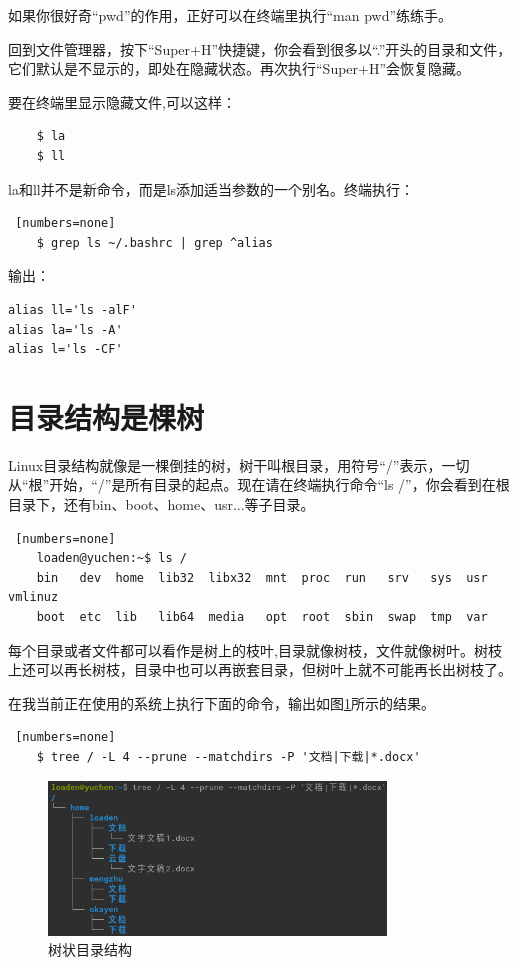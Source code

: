 \par 如果你很好奇“pwd”的作用，正好可以在终端里执行“man pwd”练练手。
\par 回到文件管理器，按下“Super+H”快捷键，你会看到很多以“.”开头的目录和文件，它们默认是不显示的，即处在隐藏状态。再次执行“Super+H”会恢复隐藏。

\par 要在终端里显示隐藏文件,可以这样：
\begin{lstlisting}
    $ la
    $ ll
\end{lstlisting}

\par la和ll并不是新命令，而是ls添加适当参数的一个别名。终端执行：
\begin{lstlisting} [numbers=none]
    $ grep ls ~/.bashrc | grep ^alias
\end{lstlisting}
\par 输出：
\begin{lstlisting}
alias ll='ls -alF'
alias la='ls -A'
alias l='ls -CF'
\end{lstlisting}


\section{目录结构是棵树}

\par Linux目录结构就像是一棵倒挂的树，树干叫根目录，用符号“/”表示，一切从“根”开始，“/”是所有目录的起点。现在请在终端执行命令“ls /”，你会看到在根目录下，还有bin、boot、home、usr...等子目录。
\begin{lstlisting} [numbers=none]
    loaden@yuchen:~$ ls /
    bin   dev  home  lib32  libx32  mnt  proc  run   srv   sys  usr  vmlinuz
    boot  etc  lib   lib64  media   opt  root  sbin  swap  tmp  var
\end{lstlisting}

\par 每个目录或者文件都可以看作是树上的枝叶,目录就像树枝，文件就像树叶。树枝上还可以再长树枝，目录中也可以再嵌套目录，但树叶上就不可能再长出树枝了。
\par 在我当前正在使用的系统上执行下面的命令，输出如图\ref{fig:2021-10-31_16-05-54}所示的结果。

\begin{lstlisting} [numbers=none]
    $ tree / -L 4 --prune --matchdirs -P '文档|下载|*.docx'
\end{lstlisting}

\begin{figure} [htbp]
	\centering
	\includegraphics [width=0.8\textwidth]{images/ch01/2021-10-31_16-05-54.png}
	\caption{树状目录结构}
	\label{fig:2021-10-31_16-05-54}
\end{figure}

